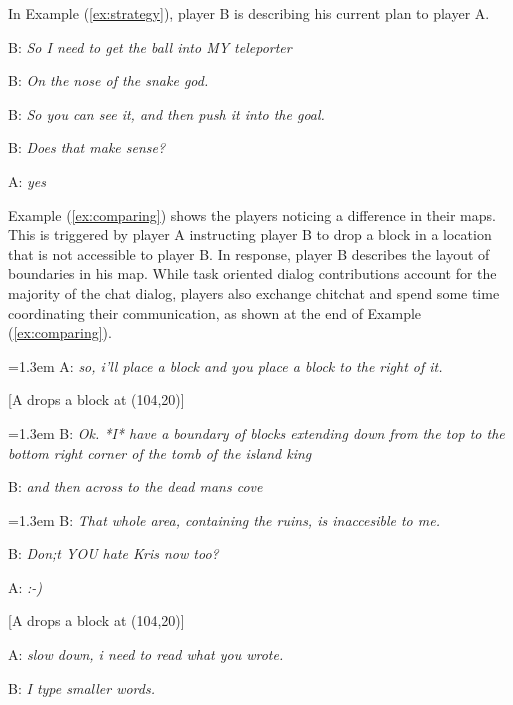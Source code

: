 In Example (\ref{ex:strategy}), player B is describing his current plan
to player A.

{\footnotesize
\begin{example}
\parbox[t]{0.9\columnwidth}{
B: \textit{So I need to get the ball into MY teleporter}

B: \textit{On the nose of the snake god.}

B: \textit{So you can see it, and then push it into the goal.}

B: \textit{Does that make sense?}

A: \textit{yes}
}
\label{ex:strategy}
\end{example}
}

Example (\ref{ex:comparing}) shows the players noticing a difference
in their maps. This is triggered by player A instructing player B to
drop a block in a location that is not accessible to player B. In
response, player B describes the layout of boundaries in his
map.  While task oriented dialog contributions account for the
majority of the chat dialog, players also exchange chitchat and spend
some time coordinating their communication, as shown at the end of
Example (\ref{ex:comparing}).


{\footnotesize
\begin{example}
\parbox[t]{0.9\columnwidth}{
\hangindent=1.3em A: \textit{so, i'll place a block and you place a block to the right of it.}

[A drops a block at (104,20)]

\hangindent=1.3em B: \textit{Ok. *I* have a boundary of blocks extending down from the top to the bottom right corner of  the tomb of the island king}

B: \textit{and then across to the dead mans cove}

\hangindent=1.3em B: \textit{That whole area, containing the ruins, is inaccesible to me.}

B: \textit{Don;t YOU hate Kris now too?}

A: \textit{:-)}

[A drops a block at (104,20)]

A: \textit{slow down, i need to read what you wrote.}

B: \textit{I type smaller words.}
}
\label{ex:comparing}
\end{example}
}
